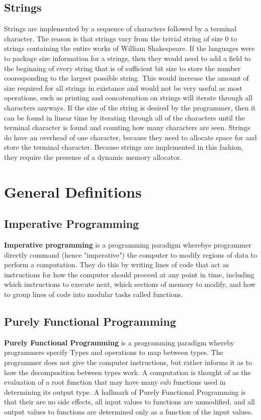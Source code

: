 \documentclass[12pt, letterpaper]{book}
\begin{document}
	\section{Strings} \label{strings}
		Strings are implemented by a sequence of characters followed by a terminal character. The reason is that strings vary from the trivial string of size 0 to strings containing the entire works of William Shakespeare. If the languages were to package size information for a strings, then they would need to add a field to the beginning of every string that is of sufficient bit size to store the number cooresponding to the largest possible string. This would increase the amount of size required for all strings in existance and would not be very useful as most operations, such as printing and concatenation on strings will iterate through all characters anyways. If the size of the string is desired by the programmer, then it can be found in linear time by iterating through all of the characters until the terminal character is found and counting how many characters are seen. Strings do have an overhead of one character, because they need to allocate space for and store the terminal character. Because strings are implemented in this fashion, they require the presense of a dynamic memory allocator.



\chapter{General Definitions}

\section{Imperative Programming}

\textbf{Imperative programming} is a programming paradigm wherebye programmer directly command (hence "imperative") the computer to modify regions of data to perform a computation. They do this by writing lines of code that act as instructions for how the computer should proceed at any point in time, including which instructions to execute next, which sections of memory to modify, and how to group lines of code into modular tasks called functions. 

\section{Purely Functional Programming}

\textbf{Purely Functional Programming} is a programming paradigm whereby programmers specify Types and operations to map between types. The programmer does not give the computer instructions, but rather informs it as to how the decomposition between types work. A computation is thought of as the evaluation of a root function that may have many sub functions used in determining its output type.
A hallmark of Purely Functional Programming is that their are no side effects, all input values to functions are unmodified, and all output values to functions are determined only as a function of the input values.
\end{document}
